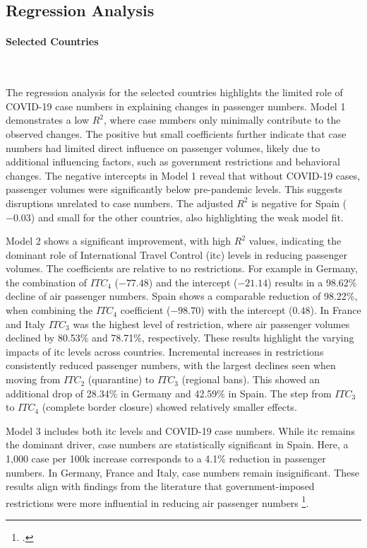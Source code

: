 \documentclass[12pt,onehalfspacing,headsepline,oneside,openright,a4paper, fleqn]{report}
\begin{document}
\newpage
\subsection*{Regression Analysis}

\paragraph{Selected Countries}
\

The regression analysis for the selected countries highlights the limited role of COVID-19 case numbers in explaining changes in passenger numbers. Model 1 demonstrates a low $R^2$, where case numbers only minimally contribute to the observed changes. The positive but small coefficients further indicate that case numbers had limited direct influence on passenger volumes, likely due to additional influencing factors, such as government restrictions and behavioral changes. The negative intercepts in Model 1 reveal that without COVID-19 cases, passenger volumes were significantly below pre-pandemic levels. This suggests disruptions unrelated to case numbers. The adjusted $R^2$ is negative for Spain ($-0.03$) and small for the other countries, also highlighting the weak model fit.

Model 2 shows a significant improvement, with high $R^2$ values, indicating the dominant role of International Travel Control (\gls{itc}) levels in reducing passenger volumes. The coefficients are relative to no restrictions. For example in Germany, the combination of $ITC_4$ ($-77.48$) and the intercept ($-21.14$) results in a 98.62\% decline of air passenger numbers. Spain shows a comparable reduction of 98.22\%, when combining the $ITC_4$ coefficient ($-98.70$) with the intercept ($0.48$). In France and Italy $ITC_3$ was the highest level of restriction, where air passenger volumes declined by 80.53\% and 78.71\%, respectively. These results highlight the varying impacts of \gls{itc} levels across countries. Incremental increases in restrictions consistently reduced passenger numbers, with the largest declines seen when moving from $ITC_2$ (quarantine) to $ITC_3$ (regional bans). This showed an additional drop of 28.34\% in Germany and 42.59\% in Spain. The step from $ITC_3$ to $ITC_4$ (complete border closure) showed relatively smaller effects.

Model 3 includes both \gls{itc} levels and COVID-19 case numbers. While \gls{itc} remains the dominant driver, case numbers are statistically significant in Spain. Here, a 1,000 case per 100k increase corresponds to a 4.1\% reduction in passenger numbers. In Germany, France and Italy, case numbers remain insignificant. These results align with findings from the literature that government-imposed restrictions were more influential in reducing air passenger numbers \footcite[10]{dube2021b}.
\end{document}
